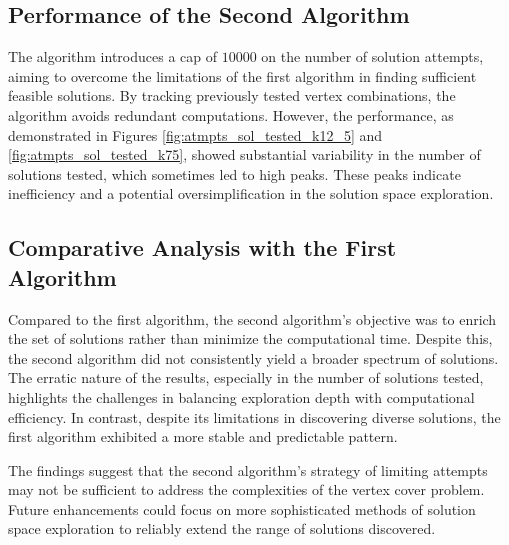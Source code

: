 \subsection{Performance of the Second Algorithm}
The algorithm introduces a cap of \(10000\) on the number of solution attempts, aiming to overcome the limitations of the first algorithm in finding sufficient feasible solutions. By tracking previously tested vertex combinations, the algorithm avoids redundant computations. However, the performance, as demonstrated in Figures \ref{fig:atmpts_sol_tested_k12_5} and \ref{fig:atmpts_sol_tested_k75}, showed substantial variability in the number of solutions tested, which sometimes led to high peaks. These peaks indicate inefficiency and a potential oversimplification in the solution space exploration.

\subsection{Comparative Analysis with the First Algorithm}
Compared to the first algorithm, the second algorithm's objective was to enrich the set of solutions rather than minimize the computational time. Despite this, the second algorithm did not consistently yield a broader spectrum of solutions. The erratic nature of the results, especially in the number of solutions tested, highlights the challenges in balancing exploration depth with computational efficiency. In contrast, despite its limitations in discovering diverse solutions, the first algorithm exhibited a more stable and predictable pattern.

The findings suggest that the second algorithm's strategy of limiting attempts may not be sufficient to address the complexities of the vertex cover problem. Future enhancements could focus on more sophisticated methods of solution space exploration to reliably extend the range of solutions discovered.



